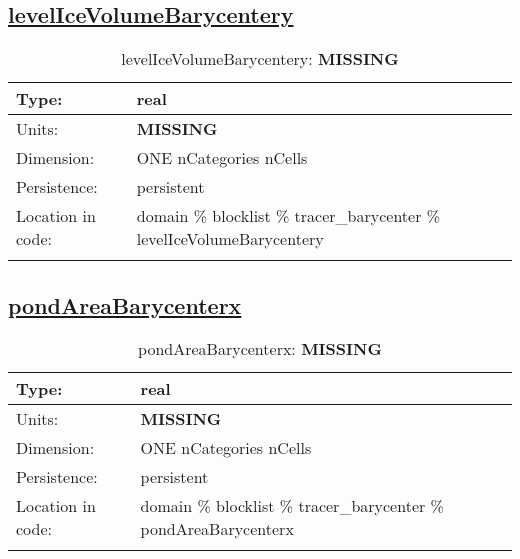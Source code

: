 \subsection[levelIceVolumeBarycentery]{\hyperref[sec:var_tab_tracer_barycenter]{levelIceVolumeBarycentery}}
\label{subsec:var_sec_tracer_barycenter_levelIceVolumeBarycentery}
\begin{center}
\begin{longtable}{| p{2.0in} | p{4.0in} |}
        \hline 
        Type: & real \\
        \hline 
        Units: & {\bf \color{red} MISSING} \\
        \hline 
        Dimension: & ONE nCategories nCells \\
        \hline 
        Persistence: & persistent \\
        \hline 
         Location in code: & domain \% blocklist \% tracer\_barycenter \% levelIceVolumeBarycentery \\
         \hline 
    \caption{levelIceVolumeBarycentery: {\bf \color{red} MISSING}}
\end{longtable}
\end{center}
\subsection[pondAreaBarycenterx]{\hyperref[sec:var_tab_tracer_barycenter]{pondAreaBarycenterx}}
\label{subsec:var_sec_tracer_barycenter_pondAreaBarycenterx}
\begin{center}
\begin{longtable}{| p{2.0in} | p{4.0in} |}
        \hline 
        Type: & real \\
        \hline 
        Units: & {\bf \color{red} MISSING} \\
        \hline 
        Dimension: & ONE nCategories nCells \\
        \hline 
        Persistence: & persistent \\
        \hline 
         Location in code: & domain \% blocklist \% tracer\_barycenter \% pondAreaBarycenterx \\
         \hline 
    \caption{pondAreaBarycenterx: {\bf \color{red} MISSING}}
\end{longtable}
\end{center}

